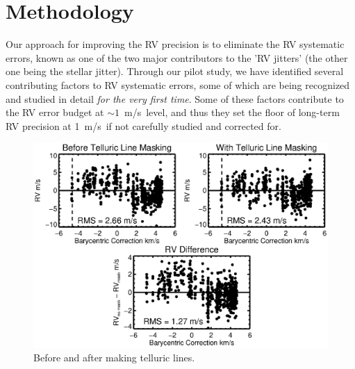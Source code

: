 \documentclass[12pt]{article}
\def\mps{m/s}
\begin{document}



\vspace{-3pt}
\section{Methodology}

Our approach for improving the RV precision is to eliminate the RV
systematic errors, known as one of the two major contributors to the
'RV jitters' (the other one being the stellar jitter). Through our
pilot study, we have identified several contributing factors to RV
systematic errors, some of which are being recognized and studied in
detail \textit{for the very first time}. Some of these factors
contribute to the RV error budget at $\sim 1$~\mps\ level, and thus
they set the floor of long-term RV precision at 1~\mps\ if not
carefully studied and corrected for.

\begin{figure}[thb]
  \vspace{-5pt}
  \begin{center}
    \includegraphics[scale=0.7]{telluric}
  \end{center}
  \vspace{-25pt}  
  \caption{Before and after making telluric lines.}
  \vspace{-8pt}  
  \label{fig:tell}
\end{figure}
\end{document}
